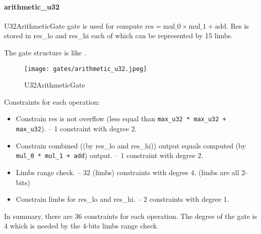 \paragraph{arithmetic\_u32}

U32ArithmeticGate gate is used for compute $\text{res} = \text{mul\_0} \times \text{mul\_1} + \text{add}$. Res is stored in res\_lo and res\_hi each of which can be represented by 15 limbs.

The gate structure is like .

\begin{figure}[!ht]
    \centering
    \texttt{[image: gates/arithmetic\_u32.jpeg]}
    \caption{U32ArithmeticGate}
    \label{fig:arithmetic-u32}
\end{figure}

Constraints for each operation:
\begin{itemize}
    \item Constrain res is not overflow (less equal than \verb|max_u32 * max_u32 + max_u32|). -- 1 constraint with degree 2.
    \item Constrain combined ((by res\_lo and res\_hi)) output equals computed (by \verb|mul_0 * mul_1 + add|) output. -- 1 constraint with degree 2.
    \item Limbs range check. -- 32 (limbs) constraints with degree 4. (limbs are all 2-bits)
    \item Constrain limbs for res\_lo and res\_hi. -- 2 constraints with degree 1.
\end{itemize}

In summary, there are 36 constraints for each operation. The degree of the gate is 4 which is needed by the 4-bits limbs range check.
